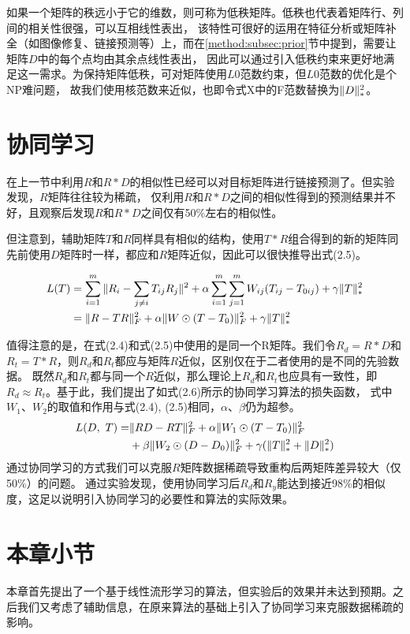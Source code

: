 如果一个矩阵的秩远小于它的维数，则可称为低秩矩阵。低秩也代表着矩阵行、列间的相关性很强，可以互相线性表出，
该特性可很好的运用在特征分析或矩阵补全（如图像修复、链接预测等）上，而在\ref{method:subsec:prior}节中提到，需要让矩阵$D$中的每个点均由其余点线性表出，
因此可以通过引入低秩约束来更好地满足这一需求。为保持矩阵低秩，可对矩阵使用$L0$范数约束，但$L0$范数的优化是个NP难问题，
故我们使用核范数来近似，也即令式X中的F范数替换为$\Arrowvert{D}\Arrowvert_*^2$。


\section{协同学习}
\label{method:sec:collaborative}
在上一节中利用$R$和$R*D$的相似性已经可以对目标矩阵进行链接预测了。但实验发现，$R$矩阵往往较为稀疏，
仅利用$R$和$R*D$之间的相似性得到的预测结果并不好，且观察后发现$R$和$R*D$之间仅有50\%左右的相似性。


但注意到，辅助矩阵$T$和$R$同样具有相似的结构，使用$T*R$组合得到的新的矩阵同先前使用$D$矩阵时一样，都应和$R$矩阵近似，因此可以很快推导出式(2.5)。

\begin{align}
L(T)&=\sum_{i=1}^m\Arrowvert{R_i-\sum_{j\neq{i}} T_{ij}R_j }\Arrowvert^2 
+\alpha\sum_{i=1}^m\sum_{j=1}^mW_{ij}(T_{ij}-T_{0ij})+\gamma\Arrowvert{T}\Arrowvert_*^2 \nonumber \\
    &=\Arrowvert{R-TR}\Arrowvert_F^2+\alpha\Arrowvert{W}\odot(T-T_0)\Arrowvert_F^2+\gamma\Arrowvert{T}\Arrowvert_*^2
\end{align}


值得注意的是，在式(2.4)和式(2.5)中使用的是同一个R矩阵。我们令$R_d=R*D$和$R_t = T*R$，则$R_d$和$R_t$都应与矩阵$R$近似，区别仅在于二者使用的是不同的先验数据。
既然$R_d$和$R_t$都与同一个$R$近似，那么理论上$R_d$和$R_t$也应具有一致性，即$R_d \approx R_t$。基于此，我们提出了如式(2.6)所示的协同学习算法的损失函数，
式中$W_1$、$W_2$的取值和作用与式(2.4), (2.5)相同，$\alpha$、$\beta$仍为超参。
\begin{align}
L(D,\ T)=&\Arrowvert{RD-RT}\Arrowvert_F^2+\alpha\Arrowvert{W_1}\odot(T-T_0)\Arrowvert_F^2 \nonumber\\
        &+\beta\Arrowvert{W_2}\odot(D-D_0)\Arrowvert_F^2+ \gamma(\Arrowvert{T}\Arrowvert_*^2+\Arrowvert{D}\Arrowvert_*^2)
\end{align}
通过协同学习的方式我们可以克服$R$矩阵数据稀疏导致重构后两矩阵差异较大（仅50\%）的问题。
通过实验发现，使用协同学习后$R_d$和$R_y$能达到接近98\%的相似度，这足以说明引入协同学习的必要性和算法的实际效果。

\section{本章小节}
本章首先提出了一个基于线性流形学习的算法，但实验后的效果并未达到预期。之后我们又考虑了辅助信息，在原来算法的基础上引入了协同学习来克服数据稀疏的影响。